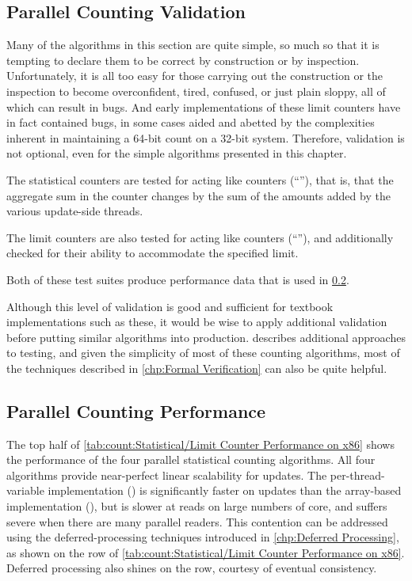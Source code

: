 \subsection{Parallel Counting Validation}
\label{sec:count:Parallel Counting Validation}

Many of the algorithms in this section are quite simple, so much so
that it is tempting to declare them to be correct by construction or
by inspection.
Unfortunately, it is all too easy for those carrying out the construction
or the inspection to become overconfident, tired, confused, or just plain
sloppy, all of which can result in bugs.
And early implementations of these limit counters have in fact contained
bugs, in some cases aided and abetted by the complexities inherent in
maintaining a 64-bit count on a 32-bit system.
Therefore, validation is not optional, even for the simple algorithms
presented in this chapter.

The statistical counters are tested for acting like counters
(``''), that is, that the aggregate sum in
the counter changes by the sum of the amounts added by the various
update-side threads.

The limit counters are also tested for acting like counters
(``''), and additionally checked for their ability
to accommodate the specified limit.

Both of these test suites produce performance data that is used
in \cref{sec:count:Parallel Counting Performance}.

Although this level of validation is good and sufficient for textbook
implementations such as these, it would be wise to apply additional
validation before putting similar algorithms into production.
 describes additional approaches to testing, and
given the simplicity of most of these counting algorithms, most of
the techniques described in \cref{chp:Formal Verification} can also
be quite helpful.

\subsection{Parallel Counting Performance}
\label{sec:count:Parallel Counting Performance}

The top half of \cref{tab:count:Statistical/Limit Counter Performance on x86}
shows the performance of the four parallel statistical counting
algorithms.
All four algorithms provide near-perfect linear scalability for updates.
The per-thread-variable implementation ()
is significantly faster on
updates than the array-based implementation
(), but is slower at reads on large numbers of core,
and suffers severe  when there are many parallel readers.
This contention can be addressed using the deferred-processing
techniques introduced in
\cref{chp:Deferred Processing},
as shown on the  row of
\cref{tab:count:Statistical/Limit Counter Performance on x86}.
Deferred processing also shines on the  row,
courtesy of eventual consistency.

